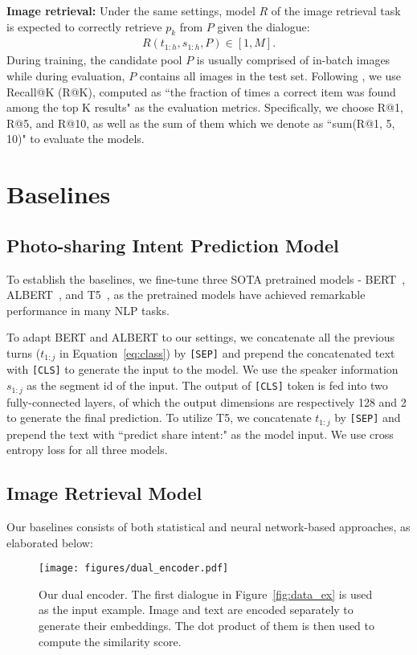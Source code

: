 \documentclass[11pt,a4paper]{article}
\begin{document}
\textbf{Image retrieval:} Under the same settings, model $R$ of the image retrieval task is expected to correctly retrieve $p_k$ from $P$ given the dialogue:\begin{align}
    R(t_{1:h}, s_{1:h}, P) \in [1, M].
\end{align}
During training, the candidate pool $P$ is usually comprised of in-batch images while 
during evaluation, $P$ contains all images in the test set. Following \citet{karpathy2015deep}, we use Recall@K (R@K), computed as ``the fraction of times a correct item was found among the top K results" as the evaluation metrics. Specifically, we choose R@1, R@5, and R@10, as well as the sum of them which we denote as ``sum(R@1, 5, 10)" to evaluate the models.

\section{Baselines}
\subsection{Photo-sharing Intent Prediction Model}
To establish the baselines, we fine-tune three SOTA pretrained models - BERT~\citep{jacob2018bert}, ALBERT~\citep{lan2020albert}, and T5~\citep{2020t5}, as the pretrained models have achieved remarkable performance in many NLP tasks.

To adapt BERT and ALBERT to our settings, we concatenate all the previous turns ($t_{1:j}$ in Equation~\ref{eq:class}) by \texttt{[SEP]} and prepend the concatenated text with \texttt{[CLS]} to generate the input to the model. We use the speaker information $s_{1:j}$ as the segment id of the input. The output of \texttt{[CLS]} token is fed into two fully-connected layers, of which the output dimensions are respectively 128 and 2 to generate the final prediction. To utilize T5, we concatenate $t_{1:j}$ by \texttt{[SEP]} and prepend the text with ``predict share intent:" as the model input. We use cross entropy loss for all three models.




\subsection{Image Retrieval Model}
Our baselines consists of both statistical and neural network-based approaches, as elaborated below:
\begin{figure*}[t]
  \centering
  \texttt{[image: figures/dual\_encoder.pdf]}
    \setlength{\abovecaptionskip}{-10pt}
  \caption{Our dual encoder. The first dialogue in Figure~\ref{fig:data_ex} is used as the input example. Image and text are encoded separately to generate their embeddings. The dot product of them is then used to compute the similarity score.}
  \label{fig:model}
  \setlength{\belowcaptionskip}{-20pt}
  \vspace{-5mm}
\end{figure*}
\end{document}
